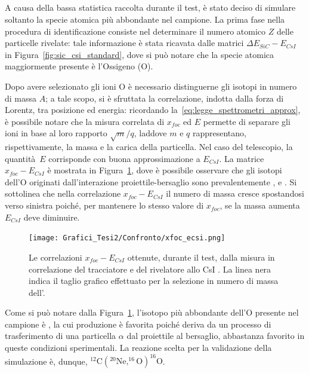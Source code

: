 
\subsection{}

A causa della bassa statistica raccolta durante il test, è stato deciso di simulare soltanto la specie atomica più abbondante nel campione.
La prima fase nella procedura di identificazione consiste nel determinare il numero atomico $Z$ delle particelle rivelate: tale informazione è stata ricavata dalle matrici $\Delta E_{SiC} - E_{CsI}$ in Figura~\ref{fig:sic_csi_standard}, dove si può notare che la specie atomica maggiormente presente è l'Ossigeno (O). 

Dopo avere selezionato gli ioni O è necessario distinguerne gli isotopi in numero di massa $A$; a tale scopo, si è sfruttata la correlazione, indotta dalla forza di Lorentz, tra posizione ed energia: ricordando la~\ref{eq:legge_spettrometri_approx}, è possibile notare che la misura correlata di $x_{foc}$ ed $E$ permette di separare gli ioni in base al loro rapporto $\sqrt{m}/q$, laddove $m$ e $q$ rappresentano, rispettivamente, la massa e la carica della particella.
Nel caso del telescopio, la quantità~$E$ corrisponde con buona approssimazione a $E_{CsI}$.
La matrice $x_{foc} - E_{CsI}$ è mostrata in Figura~\ref{fig:xfoc2_csi_standard}, dove è possibile osservare che gli isotopi dell'O originati dall'interazione proiettile-bersaglio sono prevalentemente ,  e .
Si sottolinea che nella correlazione $x_{foc} - E_{CsI}$ il numero di massa cresce spostandosi verso sinistra poiché, per mantenere lo stesso valore di $x_{foc}$, se la massa aumenta $E_{CsI}$ deve diminuire.
\begin{figure} [!p]
	\centering
	\texttt{[image: Grafici\_Tesi2/Confronto/xfoc\_ecsi.png]}
	\caption{Le correlazioni $x_{foc} - E_{CsI}$ ottenute, durante il test, dalla misura in correlazione del tracciatore e del rivelatore allo CsI . La linea nera indica il taglio grafico effettuato per la selezione in numero di massa dell'.} \label{fig:xfoc2_csi_standard}
\end{figure}
Come si può notare dalla Figura~\ref{fig:xfoc2_csi_standard}, l'isotopo più abbondante dell'O presente nel campione è , la cui produzione è favorita poiché deriva da un processo di trasferimento di una particella $\alpha$ dal proiettile al bersaglio, abbastanza favorito in queste condizioni sperimentali. 
La reazione scelta per la validazione della simulazione è, dunque, $^{12}\mbox{C}  ( ^{20}\mbox{Ne}, ^{16}\mbox{O} )  ^{16}\mbox{O} $.





